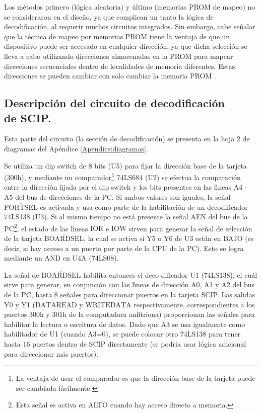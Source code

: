 Los m\'etodos primero (l\'ogica aleatoria) y \'ultimo (memorias PROM de mapeo) no se %
consideraron en el dise\~no, ya que complican un tanto la l\'ogica de decodificaci\'on, al %
requerir muchos circuitos integrados. Sin embargo, cabe se\~nalar que la t\'ecnica de mapeo por %
memorias PROM tiene la ventaja de que un dispositivo puede ser accesado en cualquier %
direcci\'on, ya que dicha selecci\'on se lleva a cabo utilizando direcciones almacenadas en la %
PROM para mapear direcciones secuenciales dentro de localidades de memoria diferentes. Estas %
direcciones se pueden cambiar con solo cambiar la memoria PROM \cite{SADYR}.


\subsection{Des\-crip\-ci\-\'on del cir\-cui\-to de de\-co\-di\-fi\-ca\-ci\-\'on\\ de %
SCIP.}
\label{Subsection:decodif}

Esta parte del circuito (la secci\'on de decodificaci\'on) se presenta en la hoja 2 de %
diagramas del Ap\'endice \ref{Apendice:diagramas}.

Se utiliza un dip switch de 8 bits (U5) para fijar la direcci\'on base de la tarjeta (300h), y %
mediante un comparador\footnote{La ventaja de usar el comparador es que la direcci\'on base %
de la tarjeta puede ser cambiada f\'acilmente.} 74LS684 (U2) se efectua la comparaci\'on entre %
la direcci\'on fijada por el dip switch y los bits presentes en las l\'{\i}neas A4 - A5 del %
bus de direcciones de la PC. Si ambos valores son iguales, la se\~nal %
$\overline{\mbox{PORTSEL}}$ es activada y usa como parte de la habilitaci\'on de un %
decodificador 74LS138 (U3). Si al mismo tiempo no est\'a presente la se\~nal AEN del bus de la %
PC\footnote{Esta se\~nal es activa en ALTO cuando hay acceso directo a memoria.}, el estado %
de las l\'{\i}neas $\overline{\mbox{IOR}}$ e $\overline{\mbox{IOW}}$ sirven para %
generar la se\~nal de selecci\'on de la tarjeta $\overline{\mbox{BOARDSEL}}$, la cual se %
activa si Y5 o Y6 de U3 est\'an en BAJO (es decir, si hay acceso a un puerto por parte de la CPU %
de la PC). Esto se logra mediante un AND en U4A (74LS08).

La se\-\~nal de $\overline{\mbox{BOARDSEL}}$ ha\-bi\-li\-ta en\-ton\-ces el de\-co\-%
di\-fi\-ca\-dor U1 (74LS138), el cu\-\'al sirve para generar, en conjunci\'on con las %
l\'{\i}neas de direcci\'on A0, A1 y A2 del bus de la PC, hasta 8 se\~nales para direccionar %
puertos en la tarjeta SCIP. Las salidas Y0 y Y1 ($\overline{\mbox{DATAREAD}}$ y %
$\overline{\mbox{WRITEDATA}}$ respectivamente, correspondientes a los puertos 300h y 301h %
de la computadora anfitriona) proporcionan las se\~nales para habilitar la lectura o escritura %
de datos. Dado que A3 se usa igualmente como habilitador de U1 (cuando A3=0), se puede colocar %
otro 74LS138 para tener hasta 16 puertos dentro de SCIP directamente (se podria usar l\'ogica %
adicional para direccionar m\'as puertos).

